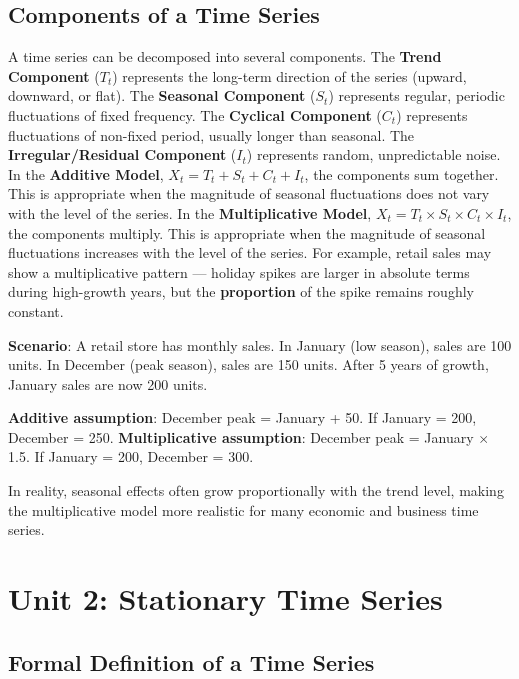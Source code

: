 \documentclass[11pt,a4paper]{article}
\begin{document}
\subsection{Components of a Time Series}

A time series can be decomposed into several components. The \textbf{Trend Component} ($T_t$) represents the long-term direction of the series (upward, downward, or flat). The \textbf{Seasonal Component} ($S_t$) represents regular, periodic fluctuations of fixed frequency. The \textbf{Cyclical Component} ($C_t$) represents fluctuations of non-fixed period, usually longer than seasonal. The \textbf{Irregular/Residual Component} ($I_t$) represents random, unpredictable noise. In the \textbf{Additive Model}, $X_t = T_t + S_t + C_t + I_t$, the components sum together. This is appropriate when the magnitude of seasonal fluctuations does not vary with the level of the series. In the \textbf{Multiplicative Model}, $X_t = T_t \times S_t \times C_t \times I_t$, the components multiply. This is appropriate when the magnitude of seasonal fluctuations increases with the level of the series. For example, retail sales may show a multiplicative pattern --- holiday spikes are larger in absolute terms during high-growth years, but the \textbf{proportion} of the spike remains roughly constant.

\begin{tcolorbox}[colback=green!5!white,colframe=green!75!black,title=\textbf{Worked Example: Additive vs Multiplicative Seasonality}]
\textbf{Scenario}: A retail store has monthly sales. In January (low season), sales are 100 units. In December (peak season), sales are 150 units. After 5 years of growth, January sales are now 200 units.

\textbf{Additive assumption}: December peak = January + 50. If January = 200, December = 250.
\textbf{Multiplicative assumption}: December peak = January $\times$ 1.5. If January = 200, December = 300.

In reality, seasonal effects often grow proportionally with the trend level, making the multiplicative model more realistic for many economic and business time series.
\end{tcolorbox}


\section{Unit 2: Stationary Time Series}

\subsection{Formal Definition of a Time Series}
\end{document}
